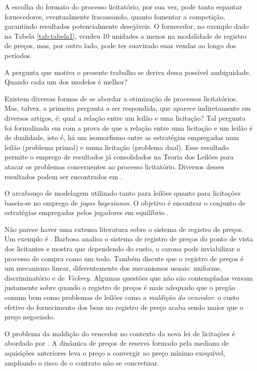 A escolha do formato do processo licitatório, por sua vez, pode tanto espantar fornecedores, eventualmente fracassando, quanto fomentar a competição, garantindo resultados potencialmente desejáveis. O fornecedor, no exemplo dado na Tabela \ref{tab:tabela1}, vendeu 10 unidades a menos na modalidade de registro de preços, mas, por outro lado, pode ter suavizado suas vendas ao longo dos períodos.

A pergunta que motiva o presente trabalho se deriva dessa possível ambiguidade. Quando cada um dos modelos é melhor?

\label{sec:revisao_bibliografica}

Existem diversas formas de se abordar a otimização de processos licitatórios. Mas, talvez, a primeira pergunta a ser respondida, que aparece indiretamente em diversos artigos, é: qual a relação entre um leilão e uma licitação? Tal pergunta foi formalizada em \citep{deCastro2010} com a prova de que a relação entre uma licitação e um leilão é de dualidade, isto é, há um isomorfismo entre as estratégias empregadas num leilão (problema primal) e numa licitação (problema dual). Esse resultado permite o emprego de resultados já consolidados na Teoria dos Leilões para atacar os problemas concernentes ao processo licitatório. Diversos desses resultados podem ser encontrados em \citep{krishna}.

O arcabouço de modelagem utilizado tanto para leilões quanto para licitações baseia-se no emprego de \emph{jogos bayesianos}. O objetivo é encontrar o conjunto de estratégias empregadas pelos jogadores em equilíbrio \citep{Bugarin2022, barbosa2013}.

Não parece haver uma extensa literatura sobre o sistema de registro de preços. Um exemplo é \citep{barbosa2013}. Barbosa analisa o sistema de registro de preços do ponto de vista dos licitantes e mostra que dependendo do custo, o carona pode inviabilizar o processo de compra como um todo. Também discute que o registro de preços é um mecanismo linear, diferentemente dos mecanismos usuais: uniforme, discriminatório e de \emph{Vickrey}. Algumas questões que não são contempladas versam justamente sobre quando o registro de preços é mais adequado que o pregão comum bem como problemas de leilões como a \emph{maldição do vencedor}: o custo efetivo do fornecimento dos bens no registro de preço acaba sendo maior que o preço negociado.

O problema da maldição do vencedor no contexto da nova lei de licitações é abordado por \citep{Signor2022}. A dinâmica de preços de reserva formado pela mediana de aquisições anteriores leva o preço a convergir ao preço mínimo exequível, ampliando o risco de o contrato não se concretizar. 

